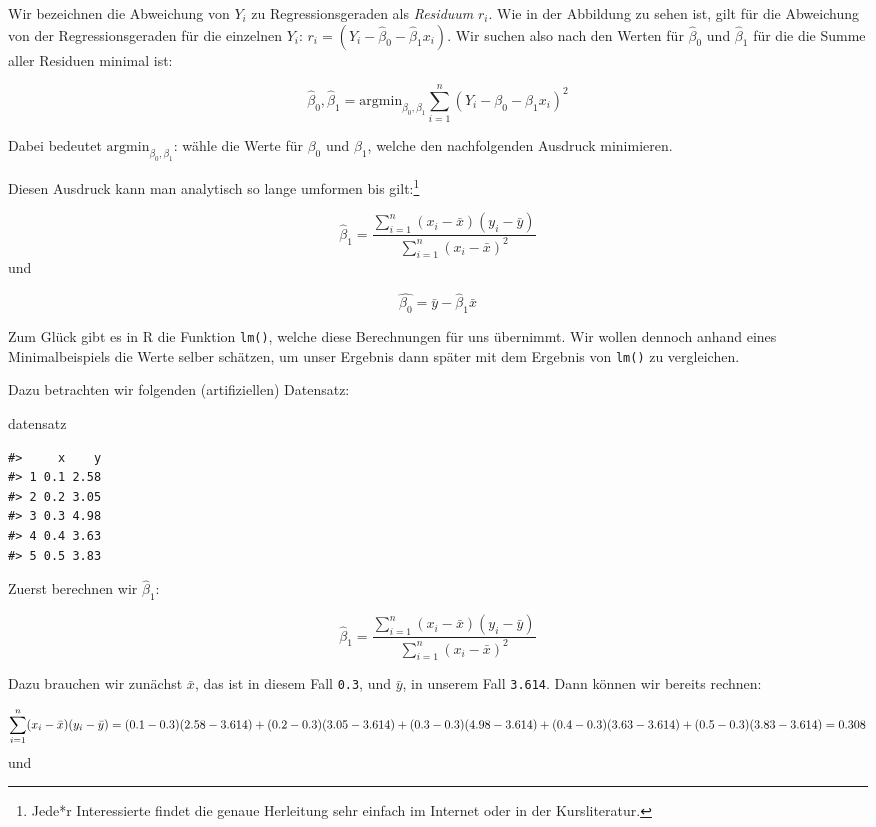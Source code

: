 \documentclass[]{book}
\newenvironment{Shaded}{\begin{snugshade}}{\end{snugshade}}
\newcommand{\NormalTok}[1]{#1}
\let\rmarkdownfootnote\footnote%
\def\footnote{\protect\rmarkdownfootnote}
\begin{document}
Wir bezeichnen die Abweichung von \(Y_i\) zu Regressionsgeraden als
\emph{Residuum} \(r_i\). Wie in der Abbildung zu sehen ist, gilt für die
Abweichung von der Regressionsgeraden für die einzelnen \(Y_i\):
\(r_i=(Y_i-\hat{\beta}_0-\hat{\beta}_1x_i)\). Wir suchen also nach den
Werten für \(\hat{\beta}_0\) und \(\hat{\beta}_1\) für die die Summe
aller Residuen minimal ist:

\[\hat{\beta}_0, \hat{\beta}_1 =\text{argmin}_{\beta_0, \beta_1} \sum_{i=1}^n(Y_i-\beta_0-\beta_1x_i)^2\]

Dabei bedeutet \(\text{argmin}_{\beta_0, \beta_1}\): wähle die Werte für
\(\beta_0\) und \(\beta_1\), welche den nachfolgenden Ausdruck
minimieren.

Diesen Ausdruck kann man analytisch so lange umformen bis
gilt:\footnote{Jede*r Interessierte findet die genaue Herleitung sehr
  einfach im Internet oder in der Kursliteratur.}

\[\hat{\beta}_1 = \frac{\sum_{i=1}^n(x_i-\bar{x})(y_i-\bar{y})}{\sum_{i=1}^n(x_i-\bar{x})^2}\]
und

\[\hat{\beta_0}=\bar{y}-\hat{\beta}_1\bar{x}\]

Zum Glück gibt es in R die Funktion \texttt{lm()}, welche diese
Berechnungen für uns übernimmt. Wir wollen dennoch anhand eines
Minimalbeispiels die Werte selber schätzen, um unser Ergebnis dann
später mit dem Ergebnis von \texttt{lm()} zu vergleichen.

Dazu betrachten wir folgenden (artifiziellen) Datensatz:

\begin{Shaded}
\begin{Highlighting}[]
\NormalTok{datensatz}
\end{Highlighting}
\end{Shaded}

\begin{verbatim}
#>     x    y
#> 1 0.1 2.58
#> 2 0.2 3.05
#> 3 0.3 4.98
#> 4 0.4 3.63
#> 5 0.5 3.83
\end{verbatim}

Zuerst berechnen wir \(\hat{\beta}_1\):

\[\hat{\beta}_1 = \frac{\sum_{i=1}^n(x_i-\bar{x})(y_i-\bar{y})}{\sum_{i=1}^n(x_i-\bar{x})^2}\]

Dazu brauchen wir zunächst \(\bar{x}\), das ist in diesem Fall
\texttt{0.3}, und \(\bar{y}\), in unserem Fall \texttt{3.614}. Dann
können wir bereits rechnen:

\[\sum_{i=1}^n(x_i-\bar{x})(y_i-\bar{y})=(0.1-0.3)(2.58-3.614)+(0.2-0.3)(3.05-3.614)\\+(0.3-0.3)(4.98-3.614)+(0.4-0.3)(3.63-3.614)+(0.5-0.3)(3.83-3.614)=0.308\]
und
\end{document}
